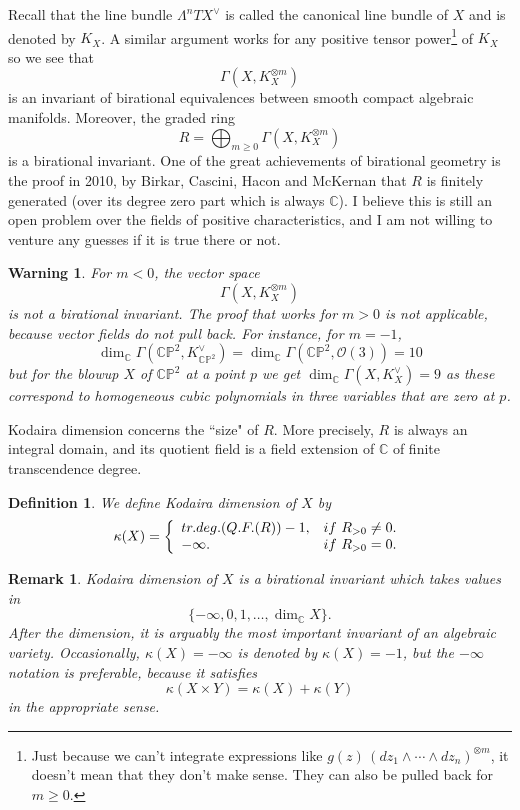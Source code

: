 \documentclass[11pt]{article}
\numberwithin{equation}{section}
\numberwithin{footnote}{section}
\newtheorem{defn}[thm]{Definition}
\newtheorem{war}[thm]{Warning}
\newtheorem{rem}[thm]{Remark}
\newcommand{\red}{\color{red}}
\renewcommand{\P}{{\mathbb P}}
\newcommand{\C}{{\mathbb C}}
\begin{document}
\smallskip
Recall that the line bundle $\Lambda^n TX^{\vee}$ is called the canonical line bundle of $X$ and is denoted by $K_X$. 
A similar argument works for any positive tensor power\footnote{ Just because we can't integrate expressions like 
$g(z) \,(dz_1\wedge \cdots \wedge dz_n)^{\otimes m}$, it doesn't mean that they don't make sense. They can also be pulled back for $m\geq 0$.} of $K_X$ so we see that 
$$
\Gamma(X,K_X^{\otimes m})
$$
is an invariant of birational equivalences between smooth compact algebraic manifolds.
Moreover, the graded ring
$$
R = \bigoplus_{m\geq 0}\Gamma(X,K_X^{\otimes m})
$$
is a birational invariant. One of the great achievements of birational geometry is the proof in 2010,
by Birkar, Cascini, Hacon and McKernan \cite{BCHM1,BCHM2} that 
$R$ is finitely generated (over its degree zero part which is always $\C$). I believe this is still an open problem over the fields of positive characteristics, and I am not willing to venture any guesses if it is true there or not.

\smallskip
\begin{war}
For $m<0$, the vector space 
$$
\Gamma(X,K_X^{\otimes m}) 
$$
is {\red not} a birational invariant. The proof that works for $m>0$ is not applicable, because vector fields do not pull back. For instance, for $m=-1$, 
$$\dim_\C \Gamma(\C\P^2, K_{\C\P^2}^\vee) = \dim_\C \Gamma(\C\P^2,\mathcal O (3))=10$$
but for the blowup $X$ of $\C\P^2$ at a  point $p$ we get 
$\dim_\C \Gamma(X, K_X^\vee) = 9$ as these correspond to homogeneous cubic polynomials in three variables that are zero at $p$.
\end{war}


\smallskip
Kodaira dimension concerns the ``size" of $R$. More precisely, $R$ is always an integral domain, and its quotient field is a field extension of $\C$ of finite transcendence degree. 

\smallskip
\begin{defn}
We define Kodaira dimension of $X$ by
$$
\kappa(X) = \left\{
\begin{array}{ll}
{\rm tr.deg.}(Q.F.(R))-1,&{\rm if~}R_{>0}\neq 0.\\
-\infty.&{\rm if~}R_{>0}= 0.
\end{array}
\right.
$$
\end{defn}

\begin{rem}
Kodaira dimension of $X$ is a birational invariant which takes values in 
$$
\{-\infty, 0, 1, \ldots, \dim_\C X\}.
$$
After the dimension, it is arguably the most important invariant of an algebraic variety.
Occasionally, $\kappa(X)=-\infty$ is denoted by $\kappa(X)=-1$, but the $-\infty$ notation is preferable, because it satisfies
$$
\kappa(X\times Y) = \kappa(X) + \kappa(Y)
$$
in the appropriate sense. 
\end{rem}
\end{document}
